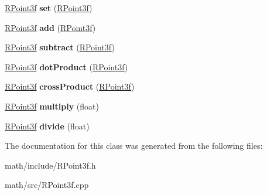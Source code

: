 \begin{DoxyCompactItemize}
\item 
\hypertarget{classRPoint3f_a6490c717e4514d4f7c7d6f1f2b141901}{
\hyperlink{classRPoint3f}{RPoint3f} {\bfseries set} (\hyperlink{classRPoint3f}{RPoint3f})}
\label{classRPoint3f_a6490c717e4514d4f7c7d6f1f2b141901}

\item 
\hypertarget{classRPoint3f_a7339009c46035a33fe9d1c8a18229593}{
\hyperlink{classRPoint3f}{RPoint3f} {\bfseries add} (\hyperlink{classRPoint3f}{RPoint3f})}
\label{classRPoint3f_a7339009c46035a33fe9d1c8a18229593}

\item 
\hypertarget{classRPoint3f_a6d93150dd498def35debe62ee73d19c7}{
\hyperlink{classRPoint3f}{RPoint3f} {\bfseries subtract} (\hyperlink{classRPoint3f}{RPoint3f})}
\label{classRPoint3f_a6d93150dd498def35debe62ee73d19c7}

\item 
\hypertarget{classRPoint3f_a67434ef289db90de0b9c262863ccb047}{
\hyperlink{classRPoint3f}{RPoint3f} {\bfseries dotProduct} (\hyperlink{classRPoint3f}{RPoint3f})}
\label{classRPoint3f_a67434ef289db90de0b9c262863ccb047}

\item 
\hypertarget{classRPoint3f_a02e9e481d1845a008eb85fefe943d8f3}{
\hyperlink{classRPoint3f}{RPoint3f} {\bfseries crossProduct} (\hyperlink{classRPoint3f}{RPoint3f})}
\label{classRPoint3f_a02e9e481d1845a008eb85fefe943d8f3}

\item 
\hypertarget{classRPoint3f_a4be010ccc48b57c6c2c390ff6bc5ff8b}{
\hyperlink{classRPoint3f}{RPoint3f} {\bfseries multiply} (float)}
\label{classRPoint3f_a4be010ccc48b57c6c2c390ff6bc5ff8b}

\item 
\hypertarget{classRPoint3f_a98bedc2e2bd8c60809dcbb62e9040657}{
\hyperlink{classRPoint3f}{RPoint3f} {\bfseries divide} (float)}
\label{classRPoint3f_a98bedc2e2bd8c60809dcbb62e9040657}

\end{DoxyCompactItemize}


The documentation for this class was generated from the following files:\begin{DoxyCompactItemize}
\item 
math/include/RPoint3f.h\item 
math/src/RPoint3f.cpp\end{DoxyCompactItemize}

